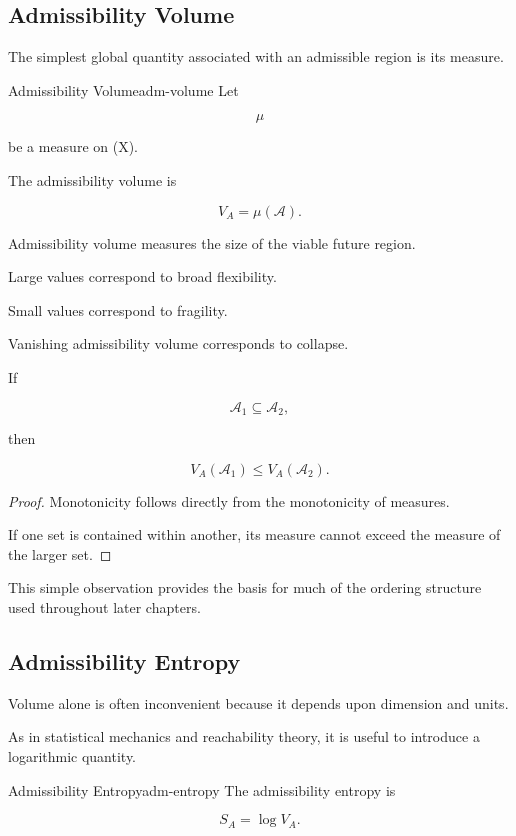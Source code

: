 \documentclass[12pt,twoside,openright]{book}
\newenvironment{prop}
{\begin{proposition}{}{}}
{\end{proposition}}
\begin{document}
\subsection{Admissibility Volume}

The simplest global quantity associated with an
admissible region is its measure.

\begin{definition}{Admissibility Volume}{adm-volume}
Let

\[
\mu
\]

be a measure on (X).

The admissibility volume is

\[
V_A
=

\mu(\mathcal A).
\]
\end{definition}

Admissibility volume measures the size of the viable
future region.

Large values correspond to broad flexibility.

Small values correspond to fragility.

Vanishing admissibility volume corresponds to collapse.

\begin{prop}
If

\[
\mathcal A_1
\subseteq
\mathcal A_2,
\]

then

\[
V_A(\mathcal A_1)
\le
V_A(\mathcal A_2).
\]
\end{prop}

\begin{proof}
Monotonicity follows directly from the monotonicity of
measures.

If one set is contained within another, its measure
cannot exceed the measure of the larger set.
\end{proof}

This simple observation provides the basis for much of
the ordering structure used throughout later chapters.

\subsection{Admissibility Entropy}

Volume alone is often inconvenient because it depends upon
dimension and units.

As in statistical mechanics and reachability theory, it
is useful to introduce a logarithmic quantity.

\begin{definition}{Admissibility Entropy}{adm-entropy}
The admissibility entropy is

\[
S_A
=

\log V_A.
\]
\end{definition}
\end{document}
